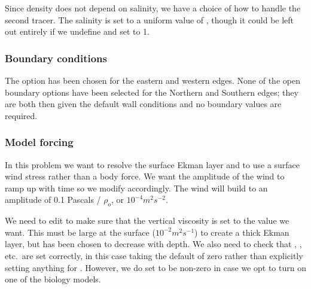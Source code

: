 Since density does not depend on salinity, we have a choice of how to
handle the second tracer. The salinity is set to a uniform value
of , though it could be left out entirely if we undefine
 and set  to 1.

\subsubsection{Boundary conditions}
The option  has been chosen for the eastern and
western edges. None of the open boundary options have been selected
for the Northern and Southern edges; they are both then given the
default wall conditions and no boundary values are required.

\subsubsection{Model forcing}
In this problem we want to resolve the
surface Ekman layer and to use a surface wind stress rather than a body
force.  We want the amplitude of the wind to ramp up with time so we
modify  accordingly.
The wind will build to an amplitude of 0.1 Pascals / $\rho_o$,
or $10^{-4} m^2 s^{-2}$.

We need to edit  to make sure that the
vertical viscosity  is set to the value we want.  This
must be large at the surface ($10^{-2} m^2 s^{-1}$) to create a thick
Ekman layer, but has been chosen to decrease with depth.  We also need
to check that , , etc.\ are
set correctly, in this case taking the default of zero rather than
explicitly setting anything for . However, we do set
 to be non-zero in case we opt to turn on one of
the biology models.


